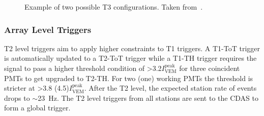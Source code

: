 \begin{figure}[t!]
  \centering
  \hfill
  \caption{Example of two possible T3 configurations. Taken from~\cite{PierreAuger:2010zof}.}
  \label{fig:T3_config}
\end{figure}

\subsubsection{Array Level Triggers}
\label{sec:Sur_det_trig_array}
T2 level triggers aim to apply higher constraints to T1 triggers. A T1-ToT trigger is automatically updated to a T2-ToT trigger while a T1-TH trigger requires the signal to pass a higher threshold condition of >3.2$I_{\text{VEM}}^{\text{peak}}$ for three coincident PMTs to get upgraded to T2-TH. For two (one) working PMTs the threshold is stricter at >3.8 (4.5)$I_{\text{VEM}}^{\text{peak}}$. After the T2 level, the expected station rate of events drops to $\sim$23 Hz. The T2 level triggers from all stations are sent to the CDAS to form a global trigger.

